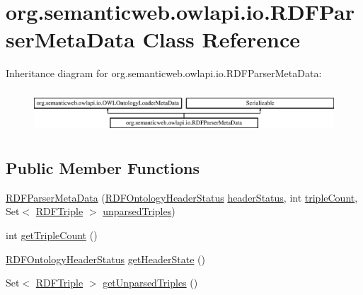 \hypertarget{classorg_1_1semanticweb_1_1owlapi_1_1io_1_1_r_d_f_parser_meta_data}{\section{org.\-semanticweb.\-owlapi.\-io.\-R\-D\-F\-Parser\-Meta\-Data Class Reference}
\label{classorg_1_1semanticweb_1_1owlapi_1_1io_1_1_r_d_f_parser_meta_data}
}
Inheritance diagram for org.\-semanticweb.\-owlapi.\-io.\-R\-D\-F\-Parser\-Meta\-Data\-:\begin{figure}[H]
\begin{center}
\leavevmode
\includegraphics[height=1.618497cm]{classorg_1_1semanticweb_1_1owlapi_1_1io_1_1_r_d_f_parser_meta_data}
\end{center}
\end{figure}
\subsection*{Public Member Functions}
\begin{DoxyCompactItemize}
\item 
\hyperlink{classorg_1_1semanticweb_1_1owlapi_1_1io_1_1_r_d_f_parser_meta_data_a426d3a2affb96f6df8eb30493c5331c3}{R\-D\-F\-Parser\-Meta\-Data} (\hyperlink{enumorg_1_1semanticweb_1_1owlapi_1_1io_1_1_r_d_f_ontology_header_status}{R\-D\-F\-Ontology\-Header\-Status} \hyperlink{classorg_1_1semanticweb_1_1owlapi_1_1io_1_1_r_d_f_parser_meta_data_add999edc775e8ab6cfa374bcf01b7ecb}{header\-Status}, int \hyperlink{classorg_1_1semanticweb_1_1owlapi_1_1io_1_1_r_d_f_parser_meta_data_a98546eecaabb9884e8335e9e8790982f}{triple\-Count}, Set$<$ \hyperlink{classorg_1_1semanticweb_1_1owlapi_1_1io_1_1_r_d_f_triple}{R\-D\-F\-Triple} $>$ \hyperlink{classorg_1_1semanticweb_1_1owlapi_1_1io_1_1_r_d_f_parser_meta_data_aa970fdfd829ac4fe15e10b49ac670c1c}{unparsed\-Triples})
\item 
int \hyperlink{classorg_1_1semanticweb_1_1owlapi_1_1io_1_1_r_d_f_parser_meta_data_ad4f1500cc1d89779f5de8b4dcb031c37}{get\-Triple\-Count} ()
\item 
\hyperlink{enumorg_1_1semanticweb_1_1owlapi_1_1io_1_1_r_d_f_ontology_header_status}{R\-D\-F\-Ontology\-Header\-Status} \hyperlink{classorg_1_1semanticweb_1_1owlapi_1_1io_1_1_r_d_f_parser_meta_data_a5ed415afe438dfde194f10f301ed53b5}{get\-Header\-State} ()
\item 
Set$<$ \hyperlink{classorg_1_1semanticweb_1_1owlapi_1_1io_1_1_r_d_f_triple}{R\-D\-F\-Triple} $>$ \hyperlink{classorg_1_1semanticweb_1_1owlapi_1_1io_1_1_r_d_f_parser_meta_data_a99ac9fe2d5dc2c07bcc91fd5542d8682}{get\-Unparsed\-Triples} ()
\end{DoxyCompactItemize}
